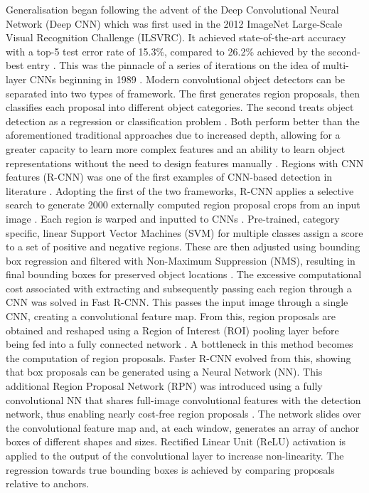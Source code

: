 \documentclass[journal]{IEEEtran}
\begin{document}
Generalisation began following the advent of the Deep Convolutional Neural Network (Deep CNN) which was first used in the 2012 ImageNet Large-Scale Visual Recognition Challenge (ILSVRC). It achieved state-of-the-art accuracy with a top-5 test error rate of 15.3\%, compared to 26.2\% achieved by the second-best entry \cite{imagenet}. This was the pinnacle of a series of iterations on the idea of multi-layer CNNs beginning in 1989 \cite{convnet}.
Modern convolutional object detectors can be separated into two types of framework. The first generates region proposals, then classifies each proposal into different object categories. The second treats object detection as a regression or classification problem \cite{detectionreview}.
Both perform better than the aforementioned traditional approaches due to increased depth, allowing for a greater capacity to learn more complex features and an ability to learn object representations without the need to design features manually \cite{deeplearning}. 
Regions with CNN features (R-CNN) was one of the first examples of CNN-based detection in literature \cite{rcnn}. Adopting the first of the two frameworks, R-CNN applies a selective search to generate 2000 externally computed region proposal crops from an input image \cite{selectivesearch}. Each region is warped and inputted to CNNs \cite{selectivesearch}. Pre-trained, category specific, linear Support Vector Machines (SVM) for multiple classes assign a score to a set of positive and negative regions. These are then adjusted using bounding box regression and filtered with Non-Maximum Suppression (NMS), resulting in final bounding boxes for preserved object locations \cite{detectionreview}.
The excessive computational cost associated with extracting and subsequently passing each region through a CNN was solved in Fast R-CNN. This passes the input image through a single CNN, creating a convolutional feature map. From this, region proposals are obtained and reshaped using a Region of Interest (ROI) pooling layer before being fed into a fully connected network \cite{fastrcnn}.
A bottleneck in this method becomes the computation of region proposals. Faster R-CNN evolved from this, showing that box proposals can be generated using a Neural Network (NN). This additional Region Proposal Network (RPN) was introduced using a fully convolutional NN that shares full-image convolutional features with the detection network, thus enabling nearly cost-free region proposals \cite{fasterrcnn}. The network slides over the convolutional feature map and, at each window, generates an array of anchor boxes of different shapes and sizes. Rectified Linear Unit (ReLU) activation is applied to the output of the convolutional layer to increase non-linearity. The regression towards true bounding boxes is achieved by comparing proposals relative to anchors.
\end{document}
